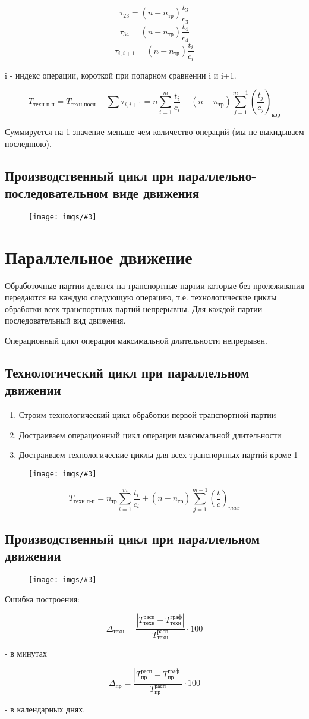 \documentclass[14pt,a4paper,oneside]{extarticle}
\newcommand{\pic}[3]{
	\begin{figure}[#1]
		\begin{center}
			\texttt{[image: imgs/\#3]}
		\end{center}
	\end{figure}
}
\begin{document}
\[\tau_{23}=(n-n_\text{тр})\frac{t_3}{c_3}\]
\[\tau_{34}=(n-n_\text{тр})\frac{t_4}{c_4}\]
\[\tau_{i,i+1}=(n-n_\text{тр})\frac{t_i}{c_i}\]

i - индекс операции, короткой при попарном сравнении i и i+1.

\[T_\text{техн п-п}=T_\text{техн посл}-\sum\tau_{i,i+1}=n\sum_{i=1}^m\frac{t_i}{c_i}-(n-n_\text{тр})\sum_{j=1}^{m-1}\left(\frac{t_j}{c_j}\right)_\text{кор} \]

Суммируется на 1 значение меньше чем количество операций (мы не выкидываем последнюю). 

\subsection{Производственный цикл при параллельно-последовательном виде движения}

\pic{H}{\textwidth}{6}

\section{Параллельное движение}

Обработочные партии делятся на транспортные партии которые без пролеживания передаются на каждую следующую операцию, т.е. технологические циклы обработки всех транспортных партий непрерывны. Для каждой партии последовательный вид движения.

Операционный цикл операции максимальной длительности непрерывен.

\subsection{Технологический цикл при параллельном движении}

\begin{enumerate}
    \item Строим технологический цикл обработки первой транспортной партии
    \item Достраиваем операционный цикл операции максимальной длительности
    \item Достраиваем технологические циклы для всех транспортных партий кроме 1
\end{enumerate}

\pic{H}{\textwidth}{7}

\[T_\text{техн п-п}=n_\text{тр}\sum_{i=1}^m\frac{t_i}{c_i}+(n-n_\text{тр})\sum_{j=1}^{m-1}\left(\frac{t}{c}\right)_{max} \]

\subsection{Производственный цикл при параллельном движении}

\pic{H}{\textwidth}{8}

Ошибка построения:

\[\Delta_\text{техн}=\frac{\left\lvert T_\text{техн}^\text{расп}-T_\text{техн}^\text{граф}\right\rvert }{T_\text{техн}^\text{расп}}\cdot 100\]

- в минутах

\[\Delta_\text{пр}=\frac{\left\lvert T_\text{пр}^\text{расп}-T_\text{пр}^\text{граф}\right\rvert }{T_\text{пр}^\text{расп}}\cdot 100\]

- в календарных днях.
\end{document}
